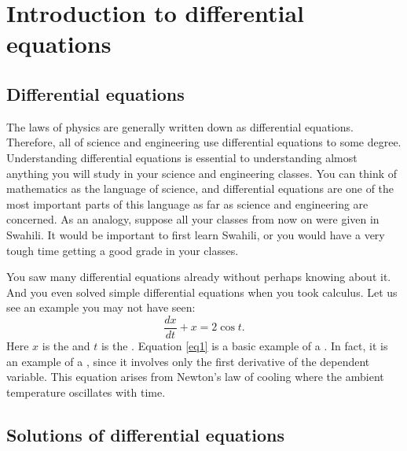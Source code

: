 \sectionnewpage
\section{Introduction to differential equations}
\label{introde:section}


\subsection{Differential equations}

The laws of physics are generally written down as differential
equations.  Therefore, all of science and engineering use
differential equations to some degree.  Understanding
differential equations is essential to understanding almost anything you will
study in your science and engineering classes.
You can think of mathematics as the language of science, and
differential equations are one of the most important parts of this
language as far as science and engineering are concerned.  As an analogy,
suppose all your classes from now on were given in Swahili.  
It would be important to first learn Swahili, or you would have a very
tough time getting a good grade in your classes.

You saw many
differential equations already without perhaps knowing about it.
And you even solved simple
differential equations when you took calculus.
Let us see an example you may not have seen:
\begin{equation} \label{eq1}
\frac{dx}{dt} + x = 2 \cos t .
\end{equation}
Here $x$ is the \emph{} and $t$ is the
\emph{}.
Equation \eqref{eq1}
is a basic example of a \emph{}.  In fact, it
is an example of a \emph{}, since
it involves only the first derivative of the dependent variable.  This 
equation arises from Newton's law of cooling where the ambient
temperature oscillates with time.

\subsection{Solutions of differential equations}

